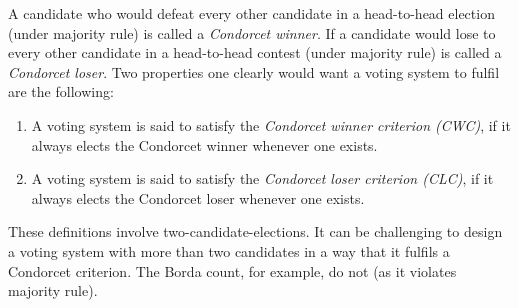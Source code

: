 A candidate who would defeat every other candidate in a head-to-head election (under majority rule) is called a {\emph{Condorcet winner}}. If a candidate would lose to every other candidate in a head-to-head contest (under majority rule) is called a {\emph{Condorcet loser}}. Two properties one clearly would want a voting system to fulfil are the following: 
\begin{enumerate}
\item A voting system is said to satisfy the {\emph{Condorcet winner criterion (CWC)}}, if it always elects the Condorcet winner whenever one exists.
\item A voting system is said to satisfy the {\emph{Condorcet loser criterion (CLC)}}, if it always elects the Condorcet loser whenever one exists. 
\end{enumerate}
These definitions involve two-candidate-elections. It can be challenging to design a voting system with more than two candidates in a way that it fulfils a Condorcet criterion. The Borda count, for example, do not (as it violates majority rule). \\
